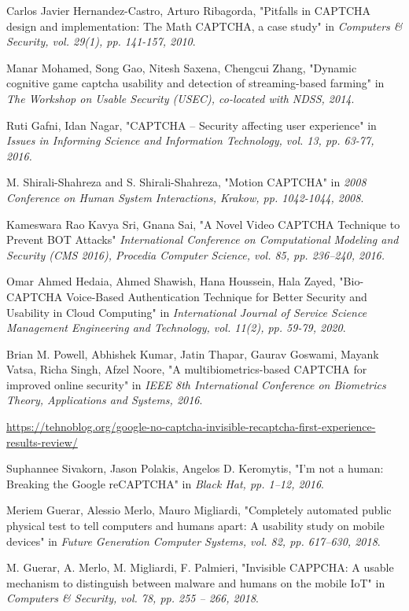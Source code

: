 \begin{thebibliography}{9}
 Carlos Javier Hernandez-Castro, Arturo Ribagorda, "Pitfalls in CAPTCHA design and implementation: The Math CAPTCHA, a case study" in \emph{Computers \& Security, vol. 29(1), pp. 141-157, 2010}.

 Manar Mohamed, Song Gao, Nitesh Saxena, Chengcui Zhang,  "Dynamic cognitive  game  captcha  usability  and  detection  of  streaming-based  farming" in \emph{The Workshop on Usable Security (USEC), co-located with NDSS, 2014}.

 Ruti Gafni, Idan Nagar, "CAPTCHA – Security affecting user experience" in \emph{Issues in Informing Science and Information Technology, vol. 13, pp. 63-77, 2016.}

 M. Shirali-Shahreza and S. Shirali-Shahreza, "Motion CAPTCHA" in \emph{2008 Conference on Human System Interactions, Krakow, pp. 1042-1044, 2008}.

 Kameswara Rao Kavya Sri, Gnana Sai, "A Novel Video CAPTCHA Technique to Prevent BOT Attacks" \emph{International Conference on Computational Modeling and  Security (CMS 2016), Procedia Computer  Science, vol. 85, pp. 236–240, 2016.}

 Omar Ahmed Hedaia, Ahmed Shawish, Hana Houssein, Hala Zayed, "Bio-CAPTCHA Voice-Based Authentication Technique for Better Security and Usability in Cloud Computing" in \emph{International Journal of Service Science Management Engineering and Technology, vol. 11(2), pp. 59-79, 2020}.

 Brian M. Powell, Abhishek Kumar, Jatin Thapar, Gaurav Goswami, Mayank Vatsa, Richa Singh, Afzel Noore, "A multibiometrics-based CAPTCHA for
improved online security" in \emph{IEEE 8th International Conference on Biometrics Theory, Applications and Systems, 2016}.

 \href{https://tehnoblog.org/google-no-captcha-invisible-recaptcha-first-experience-results-review/}{https://tehnoblog.org/google-no-captcha-invisible-recaptcha-first-experience-results-review/}

 Suphannee Sivakorn, Jason Polakis, Angelos D. Keromytis, "I'm not a human: Breaking the Google reCAPTCHA" in \emph{Black Hat, pp. 1–12, 2016}.

 Meriem Guerar, Alessio Merlo, Mauro Migliardi, "Completely automated public physical test to tell computers and humans apart: A usability study on mobile devices" in \emph{Future Generation Computer Systems, vol. 82, pp. 617–630, 2018}.

 M. Guerar, A. Merlo, M. Migliardi, F. Palmieri, "Invisible CAPPCHA: A usable mechanism to distinguish between malware and humans on the mobile IoT" in \emph{Computers \& Security, vol. 78, pp. 255 – 266, 2018}.

\end{thebibliography}